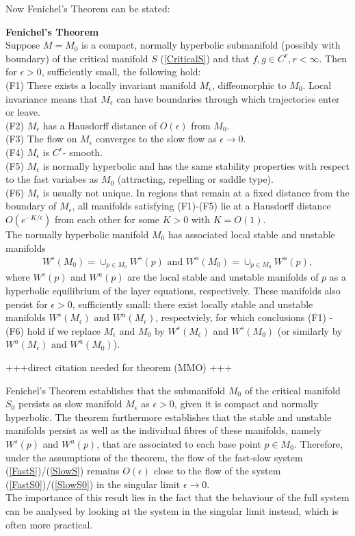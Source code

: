 Now Fenichel's Theorem can be stated:
\begin{theorem}{\textbf{Fenichel's Theorem}} \label{Fenichel}
	\\
	Suppose $M=M_0$ is a compact, normally hyperbolic submanifold  (possibly with boundary) of the critical manifold $S$ (\ref{CriticalS}) and  that $f, g \in C^r, r < \infty $. Then for $\epsilon >0$, sufficiently small, the following hold:\\
	(F1) There exists a locally invariant manifold $M_{\epsilon}$, diffeomorphic to  $M_0$. Local invariance means that $M_{\epsilon}$ can have boundaries through which trajectories enter or leave.\\
	(F2) $M_{\epsilon}$ has a Hausdorff distance of $O(\epsilon)$ from $M_0$.\\
	(F3) The flow on $M_{\epsilon}$  converges to the slow flow as $\epsilon \to 0$.\\
	(F4) $M_{\epsilon}$ is $C^r$- smooth.\\
	(F5) $M_{\epsilon}$ is normally hyperbolic and has the same stability properties with respect to the fast variabes as $M_0$ (attracting, repelling or saddle type).\\
	(F6) $M_{\epsilon}$ is usually not unique. In regions that remain at a fixed distance from the boundary of  $M_{\epsilon}$, all manifolds satisfying (F1)-(F5) lie at a Hausdorff distance $O(e^{-K/\epsilon})$ from each other for some $K>0$ with $K=O(1)$.\\
	The normally hyperbolic manifold $M_0$ has associated local stable and unstable manifolds
	\begin{align*}
	W^s(M_0) =\cup_{p \in M_0} W^s(p) \textrm{\ \ and\ \ } W^u(M_0) =\cup_{p \in M_0} W^u(p),
	\end{align*}
	where  $W^s(p)$ and $W^u(p)$ are the local stable and unstable manifolds of $p$ as a hyperbolic equilibrium of the layer equations, respectively. These manifolds also persist for $\epsilon > 0$, sufficiently small: there exist locally stable and unstable manifolds $W^s(M_\epsilon)$ and $W^u(M_\epsilon)$, respectviely, for which conclusions (F1) - (F6) hold if we replace $M_\epsilon$ and $M_0$ by  $W^s(M_\epsilon)$ and $W^s(M_0)$ (or similarly by  $W^u(M_\epsilon)$ and $W^u(M_0)$).
\end{theorem} +++direct citation needed for theorem (MMO) +++

Fenichel's Theorem establishes that the submanifold $M_0$ of the critical manifold $S_0$ persists as slow manifold $M_\epsilon$ as $\epsilon >0$, given it is compact and normally hyperbolic. The theorem furthermore establishes that the stable and unstable manifolds persist as well as the individual fibres of these manifolds, namely $W^s(p)$ and $W^u(p)$, that are associated to each base point $p \in M_0$.
Therefore, under the assumptions of the theorem, the flow of the fast-slow system (\ref{FastS})/(\ref{SlowS}) remains $O(\epsilon)$ close to the flow of the system (\ref{FastS0})/(\ref{SlowS0}) in the singular limit $\epsilon \to 0$.
\\
The importance of this result lies in the fact that the behaviour of the full system can be analysed by looking at the system in the singular limit instead, which is often more practical.


